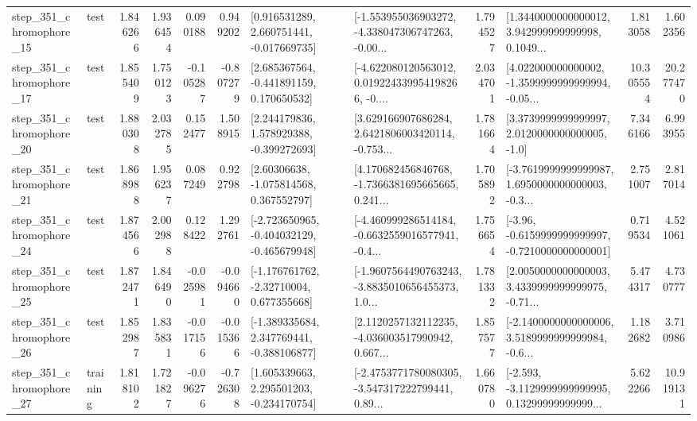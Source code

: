 \begin{tabular}{llrrrrllrlrr}
  step\_351\_chromophore\_15 &      test &      1.846266 &    1.936454 &      0.090188 &  0.949202 &    [0.916531289, 2.660751441, -0.017669735] &  [-1.553955036903272, -4.338047306747263, -0.00... &       1.794527 &  [1.3440000000000012, 3.942999999999998, 0.1049... &            1.813058 &          1.602356 \\
  step\_351\_chromophore\_17 &      test &      1.855409 &    1.750123 &     -0.105287 & -0.807279 &    [2.685367564, -0.441891159, 0.170650532] &  [-4.622080120563012, 0.019224339954198266, -0.... &       2.034701 &  [4.022000000000002, -1.3599999999999994, -0.05... &           10.305554 &         20.277470 \\
  step\_351\_chromophore\_20 &      test &      1.880308 &    2.032785 &      0.152477 &  1.508915 &    [2.244179836, 1.578929388, -0.399272693] &  [3.629166907686284, 2.6421806003420114, -0.753... &       1.781664 &     [3.3739999999999997, 2.0120000000000005, -1.0] &            7.346166 &          6.993955 \\
  step\_351\_chromophore\_21 &      test &      1.868988 &    1.956237 &      0.087249 &  0.922798 &     [2.60306638, -1.075814568, 0.367552797] &  [4.170682456846768, -1.7366381695665665, 0.241... &       1.705892 &  [-3.7619999999999987, 1.6950000000000003, -0.3... &            2.751007 &          2.817014 \\
  step\_351\_chromophore\_24 &      test &      1.874566 &    2.002988 &      0.128422 &  1.292761 &  [-2.723650965, -0.404032129, -0.465679948] &  [-4.460999286514184, -0.6632559016577941, -0.4... &       1.756654 &  [-3.96, -0.6159999999999997, -0.7210000000000001] &            0.719534 &          4.521061 \\
  step\_351\_chromophore\_25 &      test &      1.872471 &    1.846490 &     -0.025981 & -0.094660 &    [-1.176761762, -2.32710004, 0.677355668] &  [-1.9607564490763243, -3.8835010656455373, 1.0... &       1.781332 &  [2.0050000000000003, 3.4339999999999975, -0.71... &            5.474317 &          4.730777 \\
  step\_351\_chromophore\_26 &      test &      1.852987 &    1.835831 &     -0.017156 & -0.015366 &   [-1.389335684, 2.347769441, -0.388106877] &  [2.1120257132112235, -4.036003517990942, 0.667... &       1.857577 &  [-2.1400000000000006, 3.5189999999999984, -0.6... &            1.182682 &          3.710986 \\
  step\_351\_chromophore\_27 &  training &      1.818102 &    1.721827 &     -0.096276 & -0.726308 &    [1.605339663, 2.295501203, -0.234170754] &  [-2.4753771780080305, -3.547317222799441, 0.89... &       1.660780 &  [-2.593, -3.1129999999999995, 0.13299999999999... &            5.622266 &         10.919131 \\

\end{tabular}
